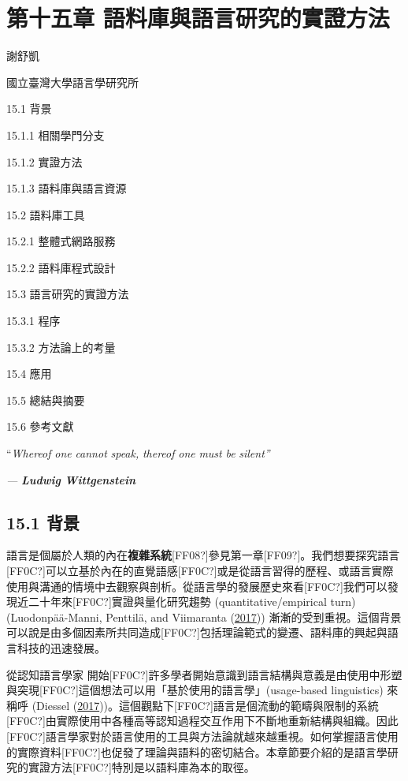 
\section{第十五章  語料庫與語言研究的實證方法}

謝舒凱

國立臺灣大學語言學研究所

15.1 背景

15.1.1 相關學門分支

15.1.2 實證方法

15.1.3 語料庫與語言資源

15.2 語料庫工具

15.2.1 整體式網路服務

15.2.2 語料庫程式設計

15.3 語言研究的實證方法

15.3.1 程序

15.3.2 方法論上的考量

15.4 應用

15.5 總結與摘要

15.6 參考文獻

“\textit{Whereof} \textit{one} \textit{cannot} \textit{speak,} \textit{thereof} \textit{one} \textit{must} \textit{be} \textit{silent”}

\textit{{}---} \textbf{\textit{Ludwig} \textit{Wittgenstein}}

\subsection{15.1 背景}

語言是個屬於人類的內在\textbf{複雜系統}[FF08?]參見第一章[FF09?]。我們想要探究語言[FF0C?]可以立基於內在的直覺語感[FF0C?]或是從語言習得的歷程、或語言實際使用與溝通的情境中去觀察與剖析。從語言學的發展歷史來看[FF0C?]我們可以發現近二十年來[FF0C?]實證與量化研究趨勢 (quantitative/empirical turn) (Luodonpää-Manni, Penttilä, and Viimaranta (\hyperlink{bookmarkid28h4qwu}{2017})) 漸漸的受到重視。這個背景可以說是由多個因素所共同造成[FF0C?]包括理論範式的變遷、語料庫的興起與語言科技的迅速發展。

從認知語言學家 \parencite{Langacker1987} 開始[FF0C?]許多學者開始意識到語言結構與意義是由使用中形塑與突現[FF0C?]這個想法可以用「基於使用的語言學」(usage-based linguistics) 來稱呼 (Diessel (\hyperlink{bookmarkid2grqrue}{2017}))。這個觀點下[FF0C?]語言是個流動的範疇與限制的系統[FF0C?]由實際使用中各種高等認知過程交互作用下不斷地重新結構與組織。因此[FF0C?]語言學家對於語言使用的工具與方法論就越來越重視。如何掌握語言使用的實際資料[FF0C?]也促發了理論與語料的密切結合。本章節要介紹的是語言學研究的實證方法[FF0C?]特別是以語料庫為本的取徑。

